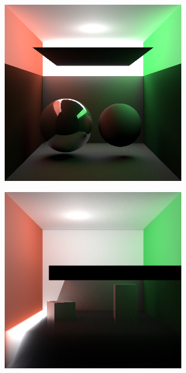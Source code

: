 \documentclass[10pt,compress,professionalfont]{beamer}
\begin{document}
\begin{frame}[c]{}

    {\centering
    \includegraphics[width=80mm]{../img/two_sphere_indir}\\
    }

\end{frame}




\begin{frame}[c]{}

    {\centering
    \includegraphics[width=80mm]{../img/one_side_corrected}\\
    }

\end{frame}
\end{document}
